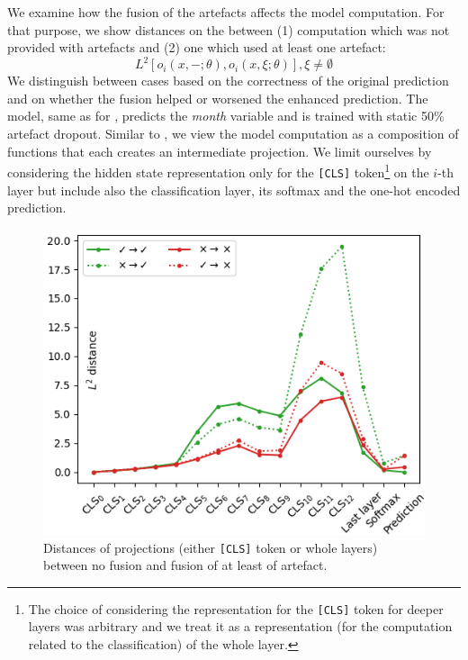 We examine how the fusion of the artefacts affects the model computation.
For that purpose, we show distances on the between (1) computation which was not provided with artefacts and (2) one which used at least one artefact:
$$
L^2[o_i(x,-;\theta), o_i(x,\xi;\theta)], \xi \neq \emptyset
$$
We distinguish between cases based on the correctness of the original prediction and on whether the fusion helped or worsened the enhanced prediction.
The model, same as for , predicts the \emph{month} variable and is trained with static 50\% artefact dropout.
Similar to , we view the model computation as a composition of functions that each creates an intermediate projection.
We limit ourselves by considering the hidden state representation only for the \texttt{[CLS]} token\footnote{The choice of considering the representation for the \texttt{[CLS]} token for deeper layers was arbitrary and we treat it as a representation (for the computation related to the classification) of the whole layer.} on the $i$-th layer but include also the classification layer, its softmax and the one-hot encoded prediction.

\begin{figure}[ht]
\centering
\vspace{0.5cm}
\includegraphics[width=1\linewidth]{img/fusion_tracing.png}
\caption{Distances of projections (either \texttt{[CLS]} token or whole layers) between no fusion and fusion of at least of artefact.}
\label{fig:fusion_tracing}
\end{figure}

